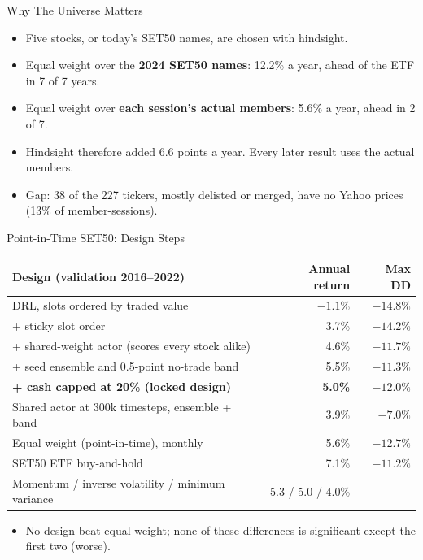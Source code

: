 \begin{frame}{Why The Universe Matters}
\begin{itemize}
  \item Five stocks, or today's SET50 names, are chosen with hindsight.
  \item Equal weight over the \textbf{2024 SET50 names}: 12.2\% a year, ahead of the ETF in 7 of 7 years.
  \item Equal weight over \textbf{each session's actual members}: 5.6\% a year, ahead in 2 of 7.
  \item Hindsight therefore added 6.6 points a year. Every later result uses the actual members.
  \item Gap: 38 of the 227 tickers, mostly delisted or merged, have no Yahoo prices (13\% of member-sessions).
\end{itemize}
\end{frame}

\begin{frame}{Point-in-Time SET50: Design Steps}
\begin{center}
\scriptsize
\begin{tabular}{lrr}
\toprule
Design (validation 2016--2022) & Annual return & Max DD \\
\midrule
DRL, slots ordered by traded value & $-1.1\%$ & $-14.8\%$ \\
+ sticky slot order & 3.7\% & $-14.2\%$ \\
+ shared-weight actor (scores every stock alike) & 4.6\% & $-11.7\%$ \\
+ seed ensemble and 0.5-point no-trade band & 5.5\% & $-11.3\%$ \\
\textbf{+ cash capped at 20\% (locked design)} & \textbf{5.0\%} & $-12.0\%$ \\
Shared actor at 300k timesteps, ensemble + band & 3.9\% & $-7.0\%$ \\
\midrule
Equal weight (point-in-time), monthly & 5.6\% & $-12.7\%$ \\
SET50 ETF buy-and-hold & 7.1\% & $-11.2\%$ \\
Momentum / inverse volatility / minimum variance & 5.3 / 5.0 / 4.0\% & \\
\bottomrule
\end{tabular}
\end{center}
\begin{itemize}
  \item No design beat equal weight; none of these differences is significant except the first two (worse).
\end{itemize}
\end{frame}

